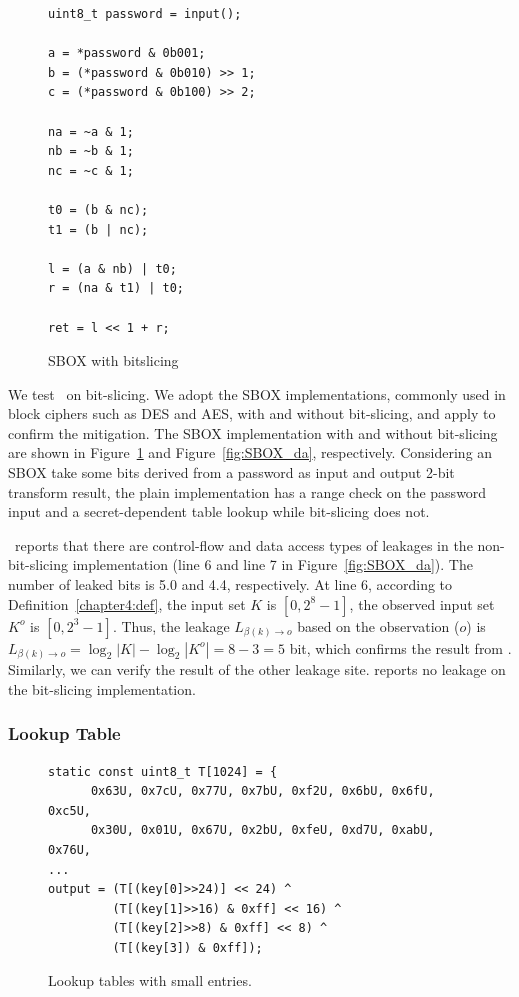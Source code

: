 \begin{figure}[h!]
    \centering
    \begin{lstlisting}[xleftmargin=.2\textwidth, xrightmargin=.0\textwidth, frame=none]
uint8_t password = input();

a = *password & 0b001;
b = (*password & 0b010) >> 1;
c = (*password & 0b100) >> 2;

na = ~a & 1;
nb = ~b & 1;
nc = ~c & 1;

t0 = (b & nc);
t1 = (b | nc);

l = (a & nb) | t0;
r = (na & t1) | t0;

ret = l << 1 + r;
\end{lstlisting}
\caption{SBOX with bitslicing}
\label{fig:SBOX_bitslicing}
\end{figure}
We test \tool\ on bit-slicing. We adopt the SBOX
implementations, commonly used in block ciphers such as DES and AES, with and
without bit-slicing, and apply \tool{} to confirm the mitigation. The SBOX implementation with and without bit-slicing are shown in Figure~\ref{fig:SBOX_bitslicing} and Figure~\ref{fig:SBOX_da}, respectively. Considering an SBOX take some bits derived from a password as input and output 2-bit transform result, the plain implementation
has a range check on the password input and a secret-dependent table lookup while bit-slicing does not.

\tool\ reports that there are control-flow and data access types of leakages
in the non-bit-slicing implementation (line 6 and line 7 in Figure~\ref{fig:SBOX_da}). The number of leaked bits is
5.0 and 4.4, respectively. At line 6, according to Definition~\ref{chapter4:def}, the
input set $K$ is $[0,2^8-1]$, the observed input set $K^o$ is $[0,2^3-1]$. Thus,
the leakage $L_{\beta(k)\rightarrow o}$ based on the observation ($o$) is
$L_{\beta(k)\rightarrow o} = \log_2{|K|} - \log_2{|K^o|} = 8-3 = 5$ bit, which
confirms the result from \tool. Similarly, we can verify the result of the other
leakage site. \tool{} reports no leakage on the bit-slicing implementation.


\subsubsection*{Lookup Table}
\begin{figure}[h]
\centering
    \begin{lstlisting}[xleftmargin=.1\textwidth, xrightmargin=.1\textwidth, frame=none]
static const uint8_t T[1024] = {
      0x63U, 0x7cU, 0x77U, 0x7bU, 0xf2U, 0x6bU, 0x6fU, 0xc5U,
      0x30U, 0x01U, 0x67U, 0x2bU, 0xfeU, 0xd7U, 0xabU, 0x76U,
...
output = (T[(key[0]>>24)] << 24) ^
         (T[(key[1]>>16) & 0xff] << 16) ^
         (T[(key[2]>>8) & 0xff] << 8) ^
         (T[(key[3]) & 0xff]);
\end{lstlisting}
  \caption{Lookup tables with small entries.}\label{fig:chapter4:small_lookup}
\end{figure}

